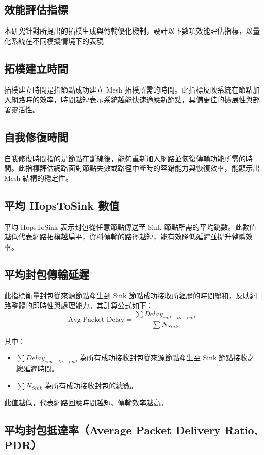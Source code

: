 \begin{ZhChapter}
\section{效能評估指標}
本研究針對所提出的拓樸生成與傳輸優化機制，設計以下數項效能評估指標，以量化系統在不同模擬情境下的表現

\subsection{拓樸建立時間}
拓樸建立時間是指節點成功建立 Mesh 拓樸所需的時間。此指標反映系統在節點加入網路時的效率，時間越短表示系統越能快速適應新節點，具備更佳的擴展性與部署靈活性。

\subsection{自我修復時間}
自我修復時間指的是節點在斷線後，能夠重新加入網路並恢復傳輸功能所需的時間。此指標評估網路面對節點失效或路徑中斷時的容錯能力與恢復效率，能顯示出 Mesh 結構的穩定性。

\subsection{平均 HopsToSink 數值}
平均 HopsToSink 表示封包從任意節點傳送至 Sink 節點所需的平均跳數。此數值越低代表網路拓樸越扁平，資料傳輸的路徑越短，能有效降低延遲並提升整體效率。

\subsection{平均封包傳輸延遲}
此指標衡量封包從來源節點產生到 Sink 節點成功接收所經歷的時間總和，反映網路整體的即時性與處理能力。其計算公式如下：
\begin{equation}
\text{Avg Packet Delay} = \frac{\sum Delay_{end-to-end}}{\sum N_{Sink}}
\end{equation}

其中：
\begin{itemize}
    \item $\sum Delay_{end-to-end}$ 為所有成功接收封包從來源節點產生至 Sink 節點接收之總延遲時間。
    \item $\sum N_{Sink}$ 為所有成功接收封包的總數。
\end{itemize}

此值越低，代表網路回應時間越短、傳輸效率越高。

\subsection{平均封包抵達率（Average Packet Delivery Ratio, PDR）}


\end{ZhChapter}
